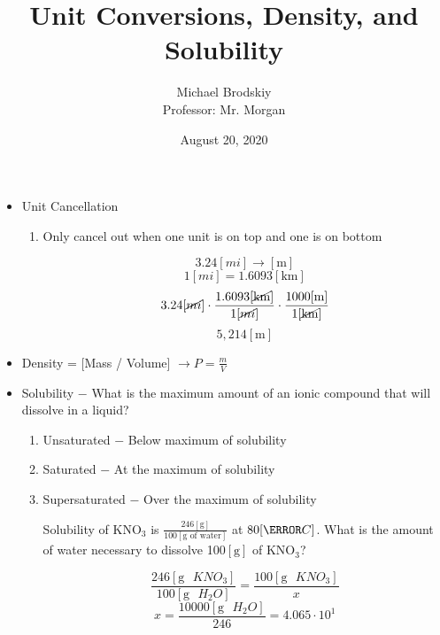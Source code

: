\documentclass[12pt]{article}
\title{Unit Conversions, Density, and Solubility}
\date{August 20, 2020}
\author{Michael Brodskiy\\ \small Professor: Mr. Morgan}
\begin{document}
\maketitle

\begin{itemize}

  \item Unit Cancellation

    \begin{enumerate}

      \item Only cancel out when one unit is on top and one is on bottom

        $$3.24[mi]\rightarrow [\si{\meter}]$$
    $$1[mi]=1.6093[\si{\kilo\meter}]$$
        $$3.24[\cancel{mi}] \cdot \frac{1.6093[\cancel{\si{\kilo\meter}}]}{1[\cancel{mi}]}\cdot \frac{1000[\si{\meter}]}{1[\cancel{\si{\kilo\meter}}]}$$
        $$5,214[\si{\meter}]$$

    \end{enumerate}

  \item Density = [Mass / Volume] $\rightarrow P=\frac{m}{V}$


  \item Solubility $-$ What is the maximum amount of an ionic compound that will dissolve in a liquid?
 
    \begin{enumerate}

      \item Unsaturated $-$ Below maximum of solubility

      \item Saturated $-$ At the maximum of solubility

      \item Supersaturated $-$ Over the maximum of solubility

        \begin{center} Solubility of KNO$_3$ is $\frac{246[\si{\gram}]}{100[\si{\gram}\text{ of water}]}$ at $80[\degree C]$. What is the amount of water necessary to dissolve 100$[\si{\gram}]$ of KNO$_3$? \end{center}

        $$\frac{246[\si{\gram}\text{ }KNO_3]}{100[\si{\gram}\text{ }H_2O]}=\frac{100[\si{\gram}\text{ }KNO_3]}{x}$$
        $$x=\frac{10000[\si{\gram}\text{ }H_2O]}{246}=4.065\cdot10^1$$

    \end{enumerate}

\end{itemize}
\end{document}
